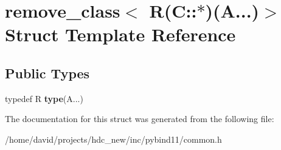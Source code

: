 \hypertarget{structremove__class_3_01_r_07_c_1_1_5_08_07_a_8_8_8_08_4}{}\section{remove\+\_\+class$<$ R(C\+:\+:$\ast$)(A...)$>$ Struct Template Reference}
\label{structremove__class_3_01_r_07_c_1_1_5_08_07_a_8_8_8_08_4}
\subsection*{Public Types}
\begin{DoxyCompactItemize}
\item 
typedef R {\bfseries type}(A...)\hypertarget{structremove__class_3_01_r_07_c_1_1_5_08_07_a_8_8_8_08_4_a523af5b571ef45044ed8c4df7bf4a4c7}{}\label{structremove__class_3_01_r_07_c_1_1_5_08_07_a_8_8_8_08_4_a523af5b571ef45044ed8c4df7bf4a4c7}

\end{DoxyCompactItemize}


The documentation for this struct was generated from the following file\+:\begin{DoxyCompactItemize}
\item 
/home/david/projects/hdc\+\_\+new/inc/pybind11/common.\+h\end{DoxyCompactItemize}
